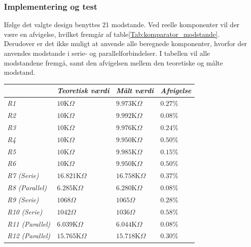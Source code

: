 \subsubsection{Implementering og test}
Ifølge det valgte design benyttes 21 modstande. Ved reelle komponenter vil der være en afvigelse, hvilket fremgår af table\ref{Tab:komparator_modstande}. Derudover er det ikke muligt at anvende alle beregnede komponenter, hvorfor der anvendes modstande i serie- og parallelforbindelser. I tabellen vil alle modstandene fremgå, samt den afvigelsen mellem den teoretiske og målte modstand. 
\begin{table}[H]
\centering
\begin{tabular}{|l|l|l|l|}
\hline
\textit{}               & \textit{Teoretisk værdi} & \textit{Målt værdi} & \textit{Afvigelse} \\ \hline
\textit{R1}             & $10$K$\Omega$            & $9.973$K$\Omega$    & $0.27\%$           \\ \hline
\textit{R2}             & $10$K$\Omega$            & $9.992$K$\Omega$    & $0.08\%$           \\ \hline
\textit{R3}             & $10$K$\Omega$            & $9.976$K$\Omega$    & $0.24\%$           \\ \hline
\textit{R4}             & $10$K$\Omega$            & $9.950$K$\Omega$    & $0.50\%$           \\ \hline
\textit{R5}             & $10$K$\Omega$            & $9.985$K$\Omega$    & $0.15\%$           \\ \hline
\textit{R6}             & $10$K$\Omega$            & $9.950$K$\Omega$    & $0.50\%$           \\ \hline
\textit{R7 (Serie)}     & $16.821$K$\Omega$        & $16.758$K$\Omega$   & $0.37\%$           \\ \hline
\textit{R8 (Parallel)}  & $6.285$K$\Omega$         & $6.280$K$\Omega$    & $0.08\%$           \\ \hline
\textit{R9 (Serie)}     & $1068\Omega$             & $1065\Omega$        & $0.28\%$           \\ \hline
\textit{R10 (Serie)}    & $1042\Omega$             & $1036\Omega$        & $0.58\%$           \\ \hline
\textit{R11 (Parallel)} & $6.039$K$\Omega$         & $6.044$K$\Omega$    & $0.08\%$           \\ \hline
\textit{R12 (Parallel)} & $15.765$K$\Omega$        & $15.718$K$\Omega$   & $0.30\%$           \\ \hline

\end{tabular}
\end{table}
